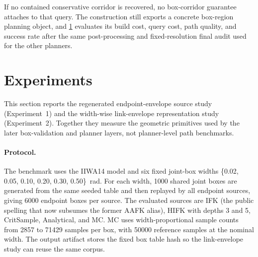 \documentclass[journal]{IEEEtran}
\DeclareRobustCommand{\textsc}[1]{\textnormal{\MakeUppercase{#1}}}
\newcommand{\calO}{\ensuremath{\mathcal{O}}}
\begin{document}

If no contained conservative corridor is recovered, no box-corridor guarantee
attaches to that query. The construction still exports a concrete box-region
planning object, and \cref{sec:exp} evaluates its build cost, query cost, path
quality, and success rate after the same post-processing and fixed-resolution
final audit used for the other planners.

\section{Experiments}\label{sec:exp}

This section reports the regenerated endpoint-envelope source study
(Experiment~1) and the width-wise link-envelope representation study
(Experiment~2). Together they measure the geometric primitives used by the
later box-validation and planner layers, not planner-level path benchmarks.

\paragraph{Protocol.}
The benchmark uses the IIWA14 model and six fixed joint-box widths
\{0.02, 0.05, 0.10, 0.20, 0.30, 0.50\}~rad. For each width, 1000 shared joint
boxes are generated from the same seeded table and then replayed by all endpoint
sources, giving 6000 endpoint boxes per source. The evaluated sources are IFK
(the public spelling that now subsumes the former AAFK alias), HIFK with depths
3 and 5, CritSample, Analytical, and MC. MC uses width-proportional sample
counts from 2857 to 71429 samples per box, with 50000 reference samples at the
nominal width. The output artifact stores the fixed box table hash so the
link-envelope study can reuse the same corpus.
\end{document}
